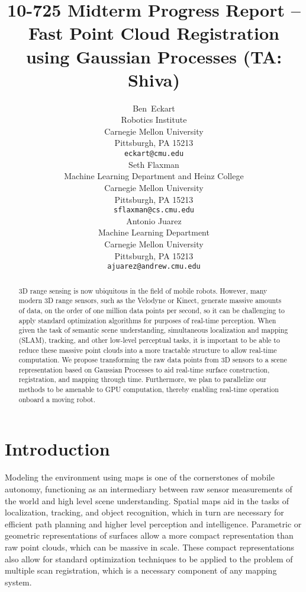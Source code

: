 \documentclass{article} %
\title{10-725 Midterm Progress Report -- Fast Point Cloud Registration using Gaussian Processes (TA: Shiva)}
\author{
Ben~Eckart\\
Robotics Institute\\
Carnegie Mellon University\\
Pittsburgh, PA 15213 \\
\texttt{eckart@cmu.edu} \\
\And
Seth Flaxman \\
Machine Learning Department and Heinz College\\
Carnegie Mellon University\\
Pittsburgh, PA 15213 \\
\texttt{sflaxman@cs.cmu.edu} \\
\And
Antonio Juarez \\
Machine Learning Department\\
Carnegie Mellon University\\
Pittsburgh, PA 15213 \\
\texttt{ajuarez@andrew.cmu.edu} \\
}
\begin{document}
\maketitle

\begin{abstract}

3D range sensing is now ubiquitous in the field of mobile robots. However, many modern 3D range sensors, such as the Velodyne or Kinect, generate massive amounts of data, on the order of one million data points per second,  so it can be challenging to apply standard optimization algorithms for purposes of real-time perception. When given the task of semantic scene understanding, simultaneous localization and mapping (SLAM), tracking, and other low-level perceptual tasks, it is important to be able to reduce these massive point clouds into a more tractable structure to allow real-time computation. We propose transforming the raw data points from 3D sensors to a scene representation based on Gaussian Processes to aid real-time surface construction, registration, and mapping through time. Furthermore, we plan to parallelize our methods to be amenable to GPU computation, thereby enabling real-time operation onboard a moving robot.  

\end{abstract}

\section{Introduction}

Modeling the environment using maps is one of the cornerstones of mobile autonomy, functioning as an intermediary between raw sensor measurements of the world and high level scene understanding. Spatial maps aid in the tasks of localization, tracking, and object recognition, which in turn are necessary for efficient path planning and higher level perception and intelligence. Parametric or geometric representations of surfaces allow a more compact representation than raw point clouds, which can be massive in scale. These compact representations also allow for standard optimization techniques to be applied to the problem of multiple scan registration, which is a necessary component of any mapping system.
\end{document}
